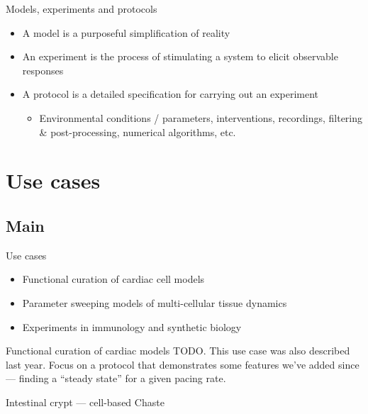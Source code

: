 \documentclass[t,xcolor={usenames,dvipsnames}]{beamer}
\newcommand{\subitem}[1]{\begin{itemize}[<.->]\item #1 \end{itemize}}
\begin{document}
\begin{frame}{Models, experiments and protocols}
\begin{itemize}
\item A \alert{model} is a purposeful simplification of reality
\item An \alert{experiment} is the process of stimulating a system to elicit observable responses
\item A \alert{protocol} is a detailed specification for carrying out an experiment
  \subitem{Environmental conditions / parameters, interventions, recordings, filtering \& post-processing, numerical algorithms, etc.}
\end{itemize}
\end{frame}


\section[Use cases]{Use cases}
\subsection*{Main}

\begin{frame}{Use cases}
\begin{itemize}
\item Functional curation of cardiac cell models
\item Parameter sweeping models of multi-cellular tissue dynamics
\item Experiments in immunology and synthetic biology
\end{itemize}
\end{frame}


\begin{frame}{Functional curation of cardiac models}
TODO.
This use case was also described last year.
Focus on a protocol that demonstrates some features we've added since
--- finding a ``steady state'' for a given pacing rate.
\end{frame}


\begin{frame}{Intestinal crypt --- cell-based Chaste}
\begin{center}
\end{center}
\end{frame}
\end{document}
